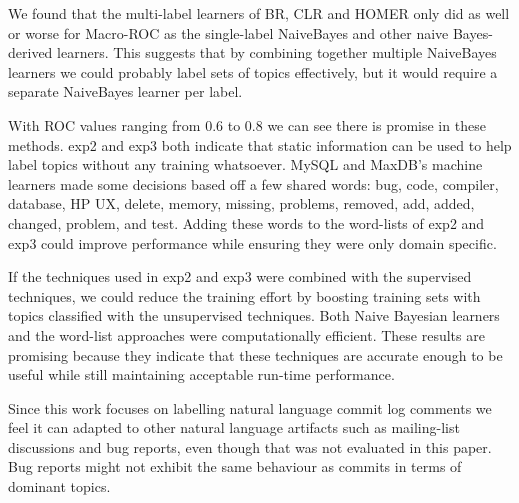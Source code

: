 \documentclass[]{sig-alternate}
\begin{document}
We found that the multi-label learners of BR, CLR and HOMER only did as well or worse for Macro-ROC as the single-label NaiveBayes and other naive Bayes-derived learners. 
This suggests that by combining together multiple NaiveBayes learners we could probably label sets of topics effectively, but it would require a separate NaiveBayes learner per label.


With ROC values ranging from $0.6$ to $0.8$ we can see there is promise in these methods.
\textsf{exp2} and \textsf{exp3} both indicate that static information can be used to help label topics without any training whatsoever. 
MySQL and MaxDB's machine learners made some decisions based off a few shared words: \textsf{bug, code, compiler, database, HP UX, delete, memory, missing, problems, removed, add, added, changed, problem, and test}. 
Adding these words to the word-lists of \textsf{exp2} and \textsf{exp3} could improve performance while ensuring they were only domain specific.

If the techniques used in \textsf{exp2} and \textsf{exp3} were combined with the supervised techniques, we could reduce the training effort by boosting training sets with topics classified with the unsupervised techniques.
Both Naive Bayesian learners and the word-list approaches were computationally efficient.  
These results are promising because they indicate that these
techniques are accurate enough to be useful while still maintaining
acceptable run-time performance.

Since this work focuses on labelling natural language commit log
comments we feel it can adapted to other natural language artifacts
such as mailing-list discussions and bug reports, even though that was
not evaluated in this paper. Bug reports might not exhibit the same
behaviour as commits in terms of dominant topics.
\end{document}
